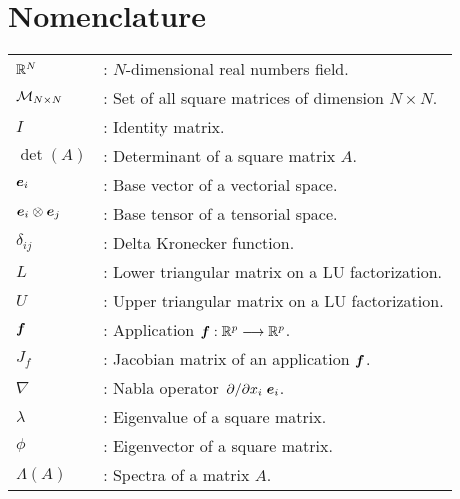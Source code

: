 \chapter*{\textbf{Nomenclature}}

\begin{tabular}{ll}
	 $\mathbb{R}^{N}$   & :  $N$-dimensional real numbers field. \\ 
	
	 $\mathcal{M}_{N \times N}$ & :  Set of all square matrices of dimension $N\times N$. \\
	
	 $I$ & :  Identity matrix. \\
	
	 $ \det(A)$ & :  Determinant of a square matrix $A$. \\
	
	 $\boldsymbol{e}_i$ & :  Base vector of a vectorial space. \\
	
	 $\boldsymbol{e}_i \otimes \boldsymbol{e}_j $ & :  Base tensor of a tensorial space. \\
	
	 $\delta_{ij}$ & :  Delta Kronecker function. \\
	
	 $L$ & :  Lower triangular matrix on a LU factorization. \\
	
	 $U$ & :  Upper triangular matrix on a LU factorization. \\
	
	 $\boldsymbol{f}$ & :  Application $\boldsymbol{f} : \mathbb{R}^{p} \longrightarrow \mathbb{R}^{p}$. \\
	
	 $J_f$ & :  Jacobian matrix of an application $\boldsymbol{f}$. \\
	
	 $\nabla$ & :  Nabla operator $\pdv*{}{x_i}\boldsymbol{e}_i$.\\
	
	
	
	 $\lambda$ & :  Eigenvalue of a square matrix.\\
	
	 $\phi$ & :  Eigenvector of a square matrix.\\
	
	
	 $\Lambda(A)$ & :  Spectra of a matrix $A$.\\


\end{tabular}
